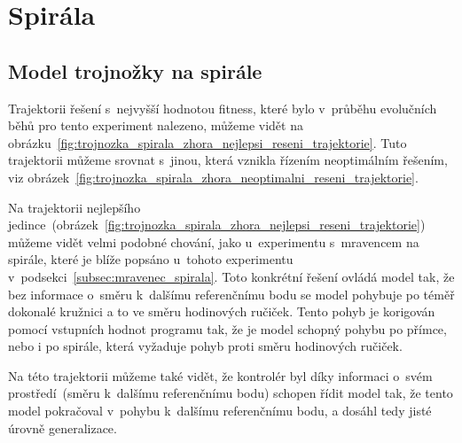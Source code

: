 
\clearpage

\section{Spirála}
\subsection{Model trojnožky na spirále}

Trajektorii řešení s~nejvyšší hodnotou fitness, které bylo v~průběhu evolučních běhů pro tento experiment nalezeno, můžeme vidět na obrázku~\ref{fig:trojnozka_spirala_zhora_nejlepsi_reseni_trajektorie}.
Tuto trajektorii můžeme srovnat s~jinou, která vznikla řízením neoptimálním řešením, viz obrázek~\ref{fig:trojnozka_spirala_zhora_neoptimalni_reseni_trajektorie}.

Na trajektorii nejlepšího jedince~(obrázek~\ref{fig:trojnozka_spirala_zhora_nejlepsi_reseni_trajektorie}) můžeme vidět velmi podobné chování, jako u~experimentu s~mravencem na spirále, které je blíže popsáno u~tohoto experimentu v~podsekci~\ref{subsec:mravenec_spirala}.
Toto konkrétní řešení ovládá model tak, že bez informace o~směru k~dalšímu referenčnímu bodu se model pohybuje po téměř dokonalé kružnici a to ve směru hodinových ručiček.
Tento pohyb je korigován pomocí vstupních hodnot programu tak, že je model schopný pohybu po přímce, nebo i po spirále, která vyžaduje pohyb proti směru hodinových ručiček.

Na této trajektorii můžeme také vidět, že kontrolér byl díky informaci o~svém prostředí~(směru k~dalšímu referenčnímu bodu) schopen řídit model tak, že tento model pokračoval v~pohybu k~dalšímu referenčnímu bodu, a dosáhl tedy jisté úrovně generalizace.


